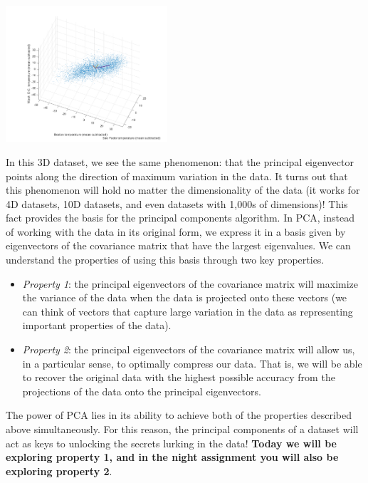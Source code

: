 \begin{center}
\includegraphics[width=0.45\textwidth]{FacesNight6/figs/tempplot.png}
\label{temps}
\end{center}

In this 3D dataset, we see the same phenomenon: that the principal eigenvector points along the direction of maximum variation in the data.  It turns out that this phenomenon will hold no matter the dimensionality of the data (it works for 4D datasets, 10D datasets, and even datasets with 1,000s of dimensions)!  This fact provides the basis for the principal components algorithm.  In PCA, instead of working with the data in its original form, we express it in a basis given by eigenvectors of the covariance matrix that have the largest eigenvalues. We can understand the properties of using this basis through two key properties.

\begin{itemize}
\item \emph{Property 1}: the principal eigenvectors of the covariance matrix will maximize the variance of the data when the data is projected onto these vectors (we can think of vectors that capture large variation in the data as representing important properties of the data).
\item \emph{Property 2}: the principal eigenvectors of the covariance matrix will allow us, in a particular sense, to optimally compress our data.  That is, we will be able to recover the original data with the highest possible accuracy from the projections of the data onto the principal eigenvectors.
\end{itemize}

The power of PCA lies in its ability to achieve both of the properties described above simultaneously.  For this reason, the principal components of a dataset will act as keys to unlocking the secrets lurking in the data!  \textbf{Today we will be exploring property 1, and in the night assignment you will also be exploring property 2}.

